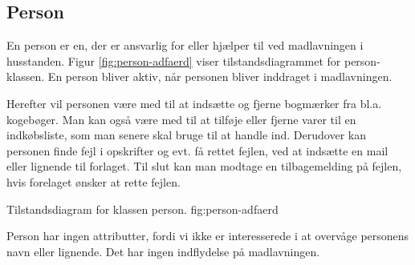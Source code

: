 \subsection{Person}
\label{sec:person}

En person er en, der er ansvarlig for eller hjælper til ved madlavningen i husstanden. Figur \ref{fig:person-adfaerd} viser tilstandsdiagrammet for person-klassen. En person bliver aktiv, når personen bliver inddraget i madlavningen. 

Herefter vil personen være med til at indsætte og fjerne bogmærker fra bl.a. kogebøger. Man kan også være med til at tilføje eller fjerne varer til en indkøbsliste, som man senere skal bruge til at handle ind. Derudover kan personen finde fejl i opskrifter og evt. få rettet fejlen, ved at indsætte en mail eller lignende til forlaget. Til slut kan man modtage en tilbagemelding på fejlen, hvis forelaget ønsker at rette fejlen.

            {Tilstandsdiagram for klassen person.}
            {fig:person-adfaerd}

Person har ingen attributter, fordi vi \fx ikke er interesserede i at overvåge personens navn eller lignende. Det har ingen indflydelse på madlavningen.
